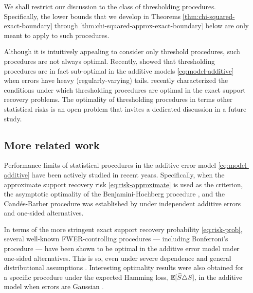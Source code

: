 We shall restrict our discussion to the class of thresholding procedures.
Specifically, the lower bounds that we develop in Theorems \ref{thm:chi-squared-exact-boundary} through \ref{thm:chi-squared-approx-exact-boundary} below are only meant to apply to such procedures.

\begin{remark}
Although it is intuitively appealing to consider only threshold procedures, such procedures are not always optimal.
Recently, \citet{chen2018scan} showed that thresholding procedures are in fact sub-optimal in the additive models \eqref{eq:model-additive} when errors have heavy (regularly-varying) tails. 
\citet{gao2018fundamental} recently characterized the conditions under which thresholding procedures are optimal in the exact support recovery problems.
The optimality of thresholding procedures in terms other statistical risks is an open problem that invites a dedicated discussion in a future study. 
\end{remark}


\subsection{More related work}

Performance limits of statistical procedures in the additive error model \eqref{eq:model-additive} have been actively studied in recent years.
Specifically, when the approximate support recovery risk \eqref{eq:risk-approximate} is used as the criterion, the asymptotic optimality of the Benjamini-Hochberg procedure \cite{benjamini1995controlling}, and the Cand\'es-Barber procedure \cite{barber2015controlling} was established by \citet*{arias2017distribution} under independent additive errors and one-sided alternatives.

In terms of the more stringent exact support recovery probability \eqref{eq:risk-prob}, several well-known FWER-controlling procedures --- including Bonferroni's procedure --- have been shown to be optimal in the additive error model under one-sided alternatives. This is so, even under severe dependence and general distributional assumptions \cite{gao2018fundamental}.
Interesting optimality results were also obtained for a specific procedure under the expected Hamming loss, ${\mathbb E}[\widehat{S}\triangle S]$, in the additive model when errors are Gaussian \cite{butucea2018variable}.

